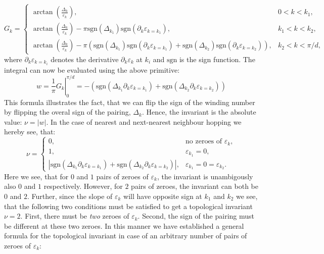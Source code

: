 \begin{equation}
G_k = \left\{ \begin{matrix} 
\arctan\left(\frac{\Delta_k}{\varepsilon_k}\right), & 0 < k < k_1, \\
\arctan\left(\frac{\Delta_k}{\varepsilon_k}\right) - \pi\text{sgn}(\Delta_{k_1})\text{sgn}\left(\partial_k\varepsilon_{k = k_1}\right), & k_1 < k < k_2, \\
\arctan\left(\frac{\Delta_k}{\varepsilon_k}\right) - \pi\left(\text{sgn}(\Delta_{k_1})\text{sgn}\left(\partial_k\varepsilon_{k = k_1}\right) + \text{sgn}(\Delta_{k_2})\text{sgn}\left(\partial_k\varepsilon_{k = k_2}\right)\right), & k_2 < k < \pi / d,
  \end{matrix} \right. \nonumber 
\end{equation}
where $\partial_k\varepsilon_{k = k_i}$ denotes the derivative $\partial_k\varepsilon_k$ at $k_i$ and $\text{sgn}$ is the sign function. The integral can now be evaluated using the above primitive:
\begin{equation}
w = \left.\frac{1}{\pi}G_k\right|^{\pi / d}_{0} = -\left( \text{sgn}\left(\Delta_{k_1}\partial_k\varepsilon_{k = k_1}\right) + \text{sgn}\left(\Delta_{k_2}\partial_k\varepsilon_{k = k_2}\right) \right) \nonumber
\end{equation}
This formula illustrates the fact, that we can flip the sign of the winding number by flipping the overal sign of the pairing, $\Delta_k$. Hence, the invariant is the absolute value: $\nu = |w|$. In the case of nearest and next-nearest neighbour hopping we hereby see, that:
\begin{equation}
\nu = \left\{ \begin{matrix} 	0, 														& \text{no zeroes of } \varepsilon_k, \\
								1, 								& \varepsilon_{k_1} = 0, \\
								\left|\text{sgn}(\Delta_{k_1}\partial_k\varepsilon_{k = k_1}) + \text{sgn}(\Delta_{k_2}\partial_k\varepsilon_{k = k_2})\right|, 	& \varepsilon_{k_1} = 0 = \varepsilon_{k_2}.
\end{matrix} \right. \nonumber
\end{equation}
Here we see, that for $0$ and $1$ pairs of zeroes of $\varepsilon_k$, the invariant is unambigously also $0$ and $1$ respectively. However, for $2$ pairs of zeroes, the invariant can both be $0$ and $2$. Further, since the slope of $\varepsilon_k$ will have opposite sign at $k_1$ and $k_2$ we see, that the following two conditions must be satisfied to get a topological invariant $\nu = 2$. First, there must be \textit{two} zeroes of $\varepsilon_k$. Second, the sign of the pairing must be different at these two zeroes. In this manner we have established a general formula for the topological invariant in case of an arbitrary number of pairs of zeroes of $\varepsilon_k$:
